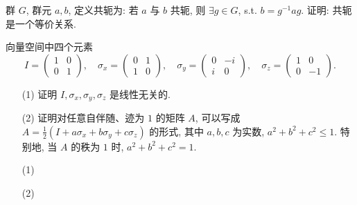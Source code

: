 \documentclass{assignment}
\begin{document}
\begin{prob}
    群 $G$, 群元 $a,b$, 定义共轭为: 若 $a$ 与 $b$ 共轭, 则 $\exists g\in G$, s.t. $b=g^{-1}ag$. 证明: 共轭是一个等价关系.
\end{prob}
\begin{pf}
    
\end{pf}

\begin{prob}
    向量空间中四个元素
    \[
        I=\begin{pmatrix}
            1&0\\
            0&1
        \end{pmatrix},\quad\sigma_x=\begin{pmatrix}
            0&1\\
            1&0
        \end{pmatrix},\quad\sigma_y=\begin{pmatrix}
            0&-i\\
            i&0
        \end{pmatrix},\quad\sigma_z=\begin{pmatrix}
            1&0\\
            0&-1
        \end{pmatrix}.
    \]
    \begin{itemize}
        \item[(1)] 证明 $I,\sigma_x,\sigma_y,\sigma_z$ 是线性无关的.
        \item[(2)] 证明对任意自伴随、迹为 $1$ 的矩阵 $A$, 可以写成 $A=\frac{1}{2}(I+a\sigma_x+b\sigma_y+c\sigma_z)$ 的形式, 其中 $a,b,c$ 为实数, $a^2+b^2+c^2\leq 1$. 特别地, 当 $A$ 的秩为 $1$ 时, $a^2+b^2+c^2=1$.
    \end{itemize}
\end{prob}
\begin{pf}
    \begin{itemize}
        \item[(1)] 
        \item[(2)] 
    \end{itemize}
\end{pf}
\end{document}
